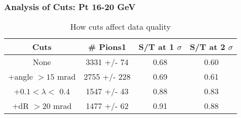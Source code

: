 \frame
{
\frametitle{Analysis of Cuts: Pt 16-20 GeV}
\begin{table}
\caption{How cuts affect data quality}
\centering
\begin{tabular}{c c c c}
\hline\hline
Cuts & \# Pions1 & S/T at 1 $\sigma$ & S/T at 2 $\sigma$ \\ [0.5ex]
\hline
None & 3331 +/-   74 & 0.68 & 0.60 \\ %
+angle $> 15$ mrad & 2755 +/-  228 & 0.69 & 0.61 \\ %
+$0.1 < \lambda <$ 0.4 & 1547 +/-   43 & 0.88 & 0.83 \\ %
+dR $> 20$ mrad & 1477 +/-   62 & 0.91 & 0.88 \\ %
[1ex]
\hline
\end{tabular}
\label{table:nonlin}
\end{table}
}
